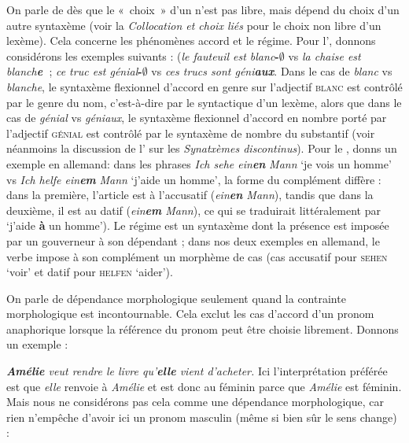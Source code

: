 {    On parle de  dès que le «~choix~» d’un  n’est pas libre, mais dépend du choix d’un autre syntaxème (voir la  \textit{Collocation et choix liés} pour le choix non libre d’un lexème). Cela concerne les phénomènes accord et le régime. Pour l', donnons considérons les exemples suivants : (\textit{le fauteuil est blanc}\textbf{{}-}\textrm{\textbf{${\emptyset}$}} vs \textit{la chaise est blanch}\textbf{\textit{e~}}; \textit{ce truc est génial}\textbf{{}-}\textrm{\textbf{${\emptyset}$}} vs \textit{ces trucs sont géni}\textbf{\textit{aux}}. Dans le cas de \textit{blanc} vs \textit{blanche}, le syntaxème flexionnel d’accord en genre sur l’adjectif \textsc{blanc} est contrôlé par le genre du nom, c’est-à-dire par le syntactique d’un lexème, alors que dans le cas de \textit{génial} vs \textit{géniaux}, le syntaxème flexionnel d’accord en nombre porté par l’adjectif \textsc{génial} est contrôlé par le syntaxème de nombre du substantif (voir néanmoins la discussion de l' sur les \textit{Synatxèmes discontinus}). Pour le , donns un exemple en allemand: dans les phrases \textit{Ich sehe ein}\textbf{\textit{en}} \textit{Mann} ‘je vois un homme’ vs \textit{Ich helfe ein}\textbf{\textit{em}} \textit{Mann} ‘j’aide un homme’, la forme du complément diffère : dans la première, l'article est à l'accusatif (\textit{ein\textbf{en} Mann}), tandis que dans la deuxième, il est au datif (\textit{ein\textbf{em} Mann}), ce qui se traduirait littéralement par ‘j’aide \textbf{à} un homme’). Le régime est un syntaxème dont la présence est imposée par un gouverneur à son dépendant ; dans nos deux exemples en allemand, le verbe impose à son complément un morphème de cas (cas accusatif pour \textsc{sehen} ‘voir’ et datif pour \textsc{helfen} ‘aider’).

    On parle de dépendance morphologique seulement quand la contrainte morphologique est incontournable. Cela exclut les cas d’accord d’un pronom anaphorique lorsque la référence du pronom peut être choisie librement. Donnons un exemple :
    
    \ea
        \textit{\textbf{{Amélie}}  {veut rendre le livre qu’}\textbf{{elle}}  {vient d’acheter.}}
    \z
    Ici l’interprétation préférée est que \textit{elle} renvoie à \textit{Amélie} et est donc au féminin parce que \textit{Amélie} est féminin. Mais nous ne considérons pas cela comme une dépendance morphologique, car rien n’empêche d’avoir ici un pronom masculin (même si bien sûr le sens change) :
    
}
